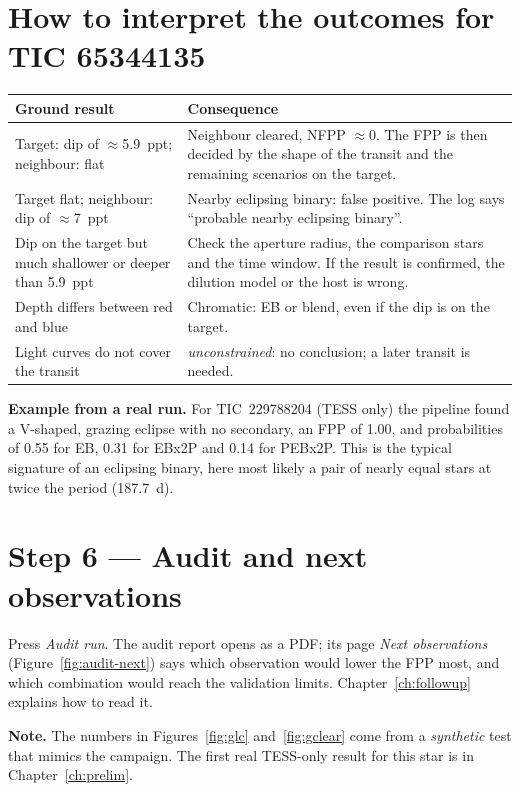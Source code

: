 \documentclass[11pt,a4paper]{report}
\begin{document}
\section*{How to interpret the outcomes for TIC 65344135}
\begin{longtable}{@{}p{}p{}@{}}
\toprule
\textbf{Ground result} & \textbf{Consequence}\\
\midrule\endhead
Target: dip of $\approx$5.9~ppt; neighbour: flat & Neighbour cleared, NFPP $\approx 0$. The FPP is then decided by the shape of the transit and the remaining scenarios on the target.\\
Target flat; neighbour: dip of $\approx$7~ppt & Nearby eclipsing binary: false positive. The log says ``probable nearby eclipsing binary''.\\
Dip on the target but much shallower or deeper than 5.9~ppt & Check the aperture radius, the comparison stars and the time window. If the result is confirmed, the dilution model or the host is wrong.\\
Depth differs between red and blue & Chromatic: EB or blend, even if the dip is on the target.\\
Light curves do not cover the transit & \emph{unconstrained}: no conclusion; a later transit is needed.\\
\bottomrule
\end{longtable}

\textbf{Example from a real run.} For TIC~229788204 (TESS only) the
pipeline found a V-shaped, grazing eclipse with no secondary, an FPP of 1.00,
and probabilities of 0.55 for EB, 0.31 for EBx2P and 0.14 for PEBx2P. This is
the typical signature of an eclipsing binary, here most likely a pair of
nearly equal stars at twice the period (187.7~d).

\section*{Step 6 --- Audit and next observations}
Press \emph{Audit run}. The audit report opens as a PDF; its page \emph{Next
observations} (Figure~\ref{fig:audit-next}) says which observation would
lower the FPP most, and which combination would reach the validation limits.
Chapter~\ref{ch:followup} explains how to read it.

\textbf{Note.} The numbers in Figures~\ref{fig:glc} and~\ref{fig:gclear}
come from a \emph{synthetic} test that mimics the campaign. The first real TESS-only result for this star is in
Chapter~\ref{ch:prelim}.
\end{document}
